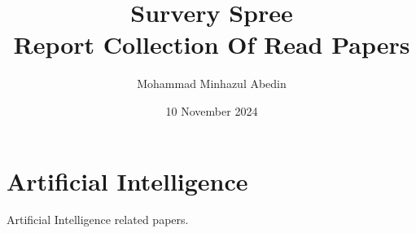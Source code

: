 \documentclass[]{report}
\title{Survery Spree \\ 
{\large Report Collection Of Read Papers } }
\author{Mohammad Minhazul Abedin}
\date{10 November 2024}
\begin{document}
\tableofcontents


\chapter{Artificial Intelligence}
Artificial Intelligence related papers.




\nocite{*}


\end{document}

